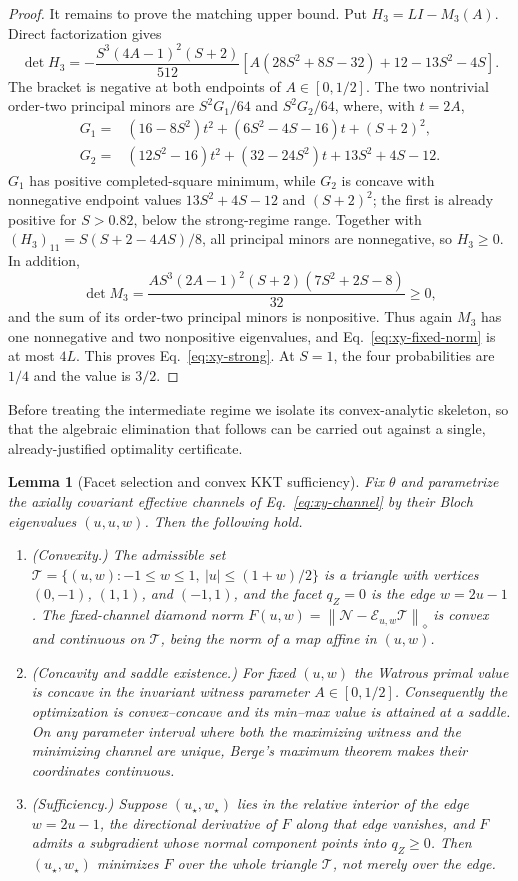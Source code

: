 \documentclass[11pt,a4paper]{article}
\newtheorem{lemma}{Lemma}
\theoremstyle{remark}
\newcommand{\cE}{\mathcal{E}}
\newcommand{\cN}{\mathcal{N}}
\newcommand{\cT}{\mathcal{T}}
\newcommand{\diamondnorm}[1]{\left\lVert #1\right\rVert_{\diamond}}
\begin{document}
\begin{proof}
It remains to prove the matching upper bound.  Put $H_3=LI-M_3(A)$.  Direct
factorization gives
\[
 \det H_3=-\frac{S^3(4A-1)^2(S+2)}{512}
 \left[A(28S^2+8S-32)+12-13S^2-4S\right].
\]
The bracket is negative at both endpoints of $A\in[0,1/2]$.  The two
nontrivial order-two principal minors are $S^2G_1/64$ and $S^2G_2/64$, where,
with $t=2A$,
\begin{align*}
 G_1={}&(16-8S^2)t^2+(6S^2-4S-16)t+(S+2)^2,\\
 G_2={}&(12S^2-16)t^2+(32-24S^2)t+13S^2+4S-12.
\end{align*}
$G_1$ has positive completed-square minimum, while $G_2$ is concave with
nonnegative endpoint values $13S^2+4S-12$ and $(S+2)^2$; the first is already
positive for $S>0.82$, below the strong-regime range.  Together with
$(H_3)_{11}=S(S+2-4AS)/8$, all principal minors are nonnegative, so
$H_3\geq0$.  In addition,
\[
 \det M_3=
 \frac{AS^3(2A-1)^2(S+2)(7S^2+2S-8)}{32}\geq0,
\]
and the sum of its order-two principal minors is nonpositive.  Thus again
$M_3$ has one nonnegative and two nonpositive eigenvalues, and
Eq.~\eqref{eq:xy-fixed-norm} is at most $4L$.  This proves
Eq.~\eqref{eq:xy-strong}.  At $S=1$, the four probabilities are $1/4$ and the
value is $3/2$.
\end{proof}

Before treating the intermediate regime we isolate its convex-analytic
skeleton, so that the algebraic elimination that follows can be carried out
against a single, already-justified optimality certificate.

\begin{lemma}[Facet selection and convex KKT sufficiency]
\label{lem:facet}
Fix $\theta$ and parametrize the axially covariant effective channels of
Eq.~\eqref{eq:xy-channel} by their Bloch eigenvalues $(u,u,w)$.  Then the
following hold.
\begin{enumerate}
\item[(i)] \emph{(Convexity.)}  The admissible set
$\mathcal T=\{(u,w): -1\leq w\leq1,\ |u|\leq(1+w)/2\}$ is a triangle with
vertices $(0,-1)$, $(1,1)$, and $(-1,1)$, and the facet $q_Z=0$ is the edge
$w=2u-1$.  The fixed-channel diamond norm
$F(u,w)=\diamondnorm{\cN-\cE_{u,w}\cT}$ is convex and continuous on
$\mathcal T$, being the norm of a map affine in $(u,w)$.
\item[(ii)] \emph{(Concavity and saddle existence.)}  For fixed $(u,w)$ the
Watrous primal value is concave in the invariant witness parameter
$A\in[0,1/2]$.  Consequently the optimization is convex--concave and its
min--max value is attained at a saddle.  On any parameter interval where both
the maximizing witness and the minimizing channel are unique, Berge's maximum
theorem makes their coordinates continuous.
\item[(iii)] \emph{(Sufficiency.)}  Suppose $(u_\star,w_\star)$ lies in the
relative interior of the edge $w=2u-1$, the directional derivative of $F$
along that edge vanishes, and $F$ admits a subgradient whose normal component
points into $q_Z\geq0$.  Then $(u_\star,w_\star)$ minimizes $F$ over the
whole triangle $\mathcal T$, not merely over the edge.
\end{enumerate}
\end{lemma}
\end{document}
